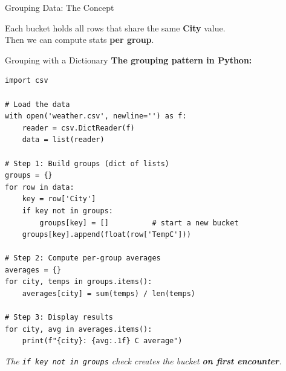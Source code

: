 \documentclass{csbeamer}
\begin{document}
\begin{frame}{Grouping Data: The Concept}
    \vspace{0.3em}
    \begin{center}
        Each bucket holds all rows that share the same \textcolor{stfxblue}{\textbf{City}} value.\\
        Then we can compute stats \textbf{per group}.
    \end{center}
\end{frame}

\begin{frame}[fragile]{Grouping with a Dictionary}
    \textbf{The grouping pattern in Python:}

    \begin{lstlisting}
import csv

# Load the data
with open('weather.csv', newline='') as f:
    reader = csv.DictReader(f)
    data = list(reader)

# Step 1: Build groups (dict of lists)
groups = {}
for row in data:
    key = row['City']
    if key not in groups:
        groups[key] = []          # start a new bucket
    groups[key].append(float(row['TempC']))

# Step 2: Compute per-group averages
averages = {}
for city, temps in groups.items():
    averages[city] = sum(temps) / len(temps)

# Step 3: Display results
for city, avg in averages.items():
    print(f"{city}: {avg:.1f} C average")
    \end{lstlisting}

    \pause

    \begin{center}
        \textit{The \textcolor{marigold}{\texttt{if key not in groups}} check creates the bucket \textbf{on first encounter}.}
    \end{center}
\end{frame}
\end{document}
